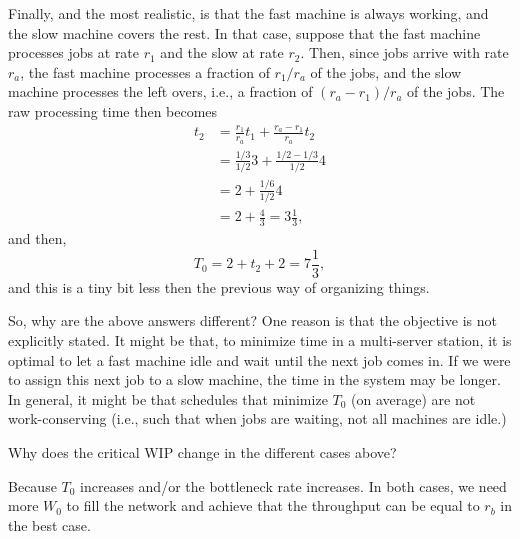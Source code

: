 \begin{exercise}
\begin{solution}
    Finally, and the most realistic, is that the fast machine is
    always working, and the slow machine covers the rest.  In that
    case, suppose that the fast machine processes jobs at rate $r_1$
    and the slow at rate $r_2$. Then, since jobs arrive with rate
    $r_a$, the fast machine processes a fraction of $r_1/r_a$ of the
    jobs, and the slow machine processes the left overs, i.e., a
    fraction of $(r_a-r_1)/r_a$ of the jobs. The raw processing time then becomes
    \begin{equation*}
      \begin{split}
      t_2 
&= \frac{r_1}{r_a} t_1 + \frac{r_a-r_1}{r_a} t_2 \\
&= \frac{1/3}{1/2} 3 + \frac{1/2-1/3}{1/2} 4 \\
&= 2 + \frac{1/6}{1/2} 4 \\
&= 2 + \frac{4}{3} = 3\frac13,
      \end{split}
    \end{equation*}
and then,
\begin{equation*}
  T_0 = 2 + t_2 + 2 = 7\frac13,
\end{equation*}
and this is a tiny bit less then the previous way of organizing things. 

So, why are the above answers different? One reason is that the
objective is not explicitly stated. It might be that, to minimize time
in a multi-server station, it is optimal to let a fast machine idle
and wait until the next job comes in. If we were to assign this next
job to a slow machine, the time in the system may be longer.  In
general, it might be that schedules that minimize $T_0$ (on average)
are not work-conserving (i.e., such that when jobs are waiting, not
all machines are idle.)
\end{solution}
\end{exercise}


\begin{exercise}
Why does the critical WIP change in the different cases above? 
\begin{solution}
  Because $T_0$ increases and/or the bottleneck rate increases. In
  both cases, we need more $W_0$ to fill the network and achieve that
  the throughput can be equal to $r_b$ in the best case.
\end{solution}
\end{exercise}

